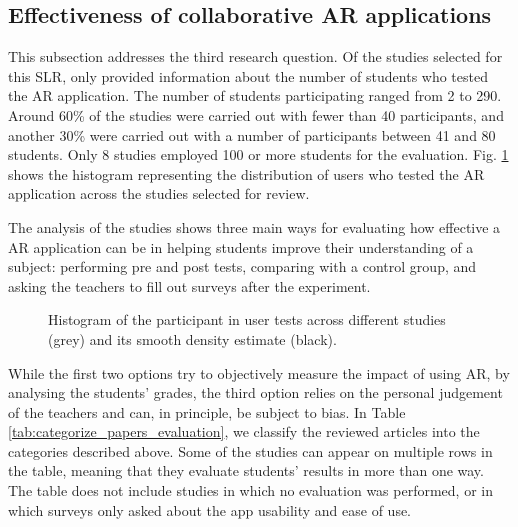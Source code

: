 \subsection{Effectiveness of collaborative AR applications}

This subsection addresses the third research question. Of the \papersSelected studies selected for this \gls{SLR}, only \papersWithNumStudentInfo provided information about the number of students who tested the AR application. The number of students participating ranged from 2 to 290. Around 60\% of the studies were carried out with fewer than 40 participants, and another 30\% were carried out with a number of participants between 41 and 80 students. Only 8 studies employed 100 or more students for the evaluation. Fig. \ref{fig:testers} shows the histogram representing the distribution of users who tested the \gls{AR} application across the studies selected for review.

The analysis of the studies shows three main ways for evaluating how effective a \gls{AR} application can be in helping students improve their understanding of a subject: performing pre and post tests, comparing with a control group, and asking the teachers to fill out surveys after the experiment.

\begin{figure}[t!]	
	\begin{center}
	
	\caption{Histogram of the participant in user tests across different studies (grey) and its smooth density estimate (black).}
	\label{fig:testers}
    \end{center}
\end{figure}

While the first two options try to objectively measure the impact of using \gls{AR}, by analysing the students' grades, the third option relies on the personal judgement of the teachers and can, in principle, be subject to bias.
In Table \ref{tab:categorize_papers_evaluation}, we classify the \papersSelected reviewed articles into the categories described above. Some of the studies can appear on multiple rows in the table, meaning that they evaluate students' results in more than one way. The table does not include studies in which no evaluation was performed, or in which surveys only asked about the app usability and ease of use.

